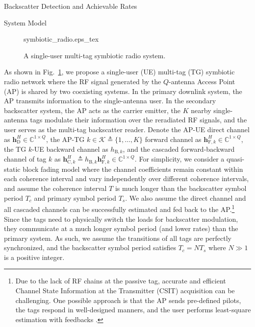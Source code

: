\documentclass[journal]{IEEEtran}
\begin{document}
	\begin{section}{Backscatter Detection and Achievable Rates}
		\begin{subsection}{System Model}
			\begin{figure}[!t]
				\centering
				\def\svgwidth{0.9\columnwidth}
				{symbiotic_radio.eps_tex}
				\caption{A single-user multi-tag symbiotic radio system.}
				\label{fi:symbiotic_radio}
			\end{figure}
			As shown in Fig.~\ref{fi:symbiotic_radio}, we propose a single-user (UE) multi-tag (TG) symbiotic radio network where the RF signal generated by the $Q$-antenna Access Point (AP) is shared by two coexisting systems. In the primary downlink system, the AP transmits information to the single-antenna user. In the secondary backscatter system, the AP acts as the carrier emitter, the $K$ nearby single-antenna tags modulate their information over the reradiated RF signals, and the user serves as the multi-tag backscatter reader. Denote the AP-UE direct channel as $\boldsymbol{h}_{\mathrm{D}}^H \in \mathbb{C}^{1 \times Q}$, the AP-TG $k \in \mathcal{K} \triangleq \{1,\ldots,K\}$ forward channel as $\boldsymbol{h}_{\mathrm{F},k}^H \in \mathbb{C}^{1 \times Q}$, the TG $k$-UE backward channel as $h_{\mathrm{B},k}$, and the cascaded forward-backward channel of tag $k$ as $\boldsymbol{h}_{\mathrm{C},k}^H \triangleq h_{\mathrm{B},k} \boldsymbol{h}_{\mathrm{F},k}^H \in \mathbb{C}^{1 \times Q}$. For simplicity, we consider a quasi-static block fading model where the channel coefficients remain constant within each coherence interval and vary independently over different coherence intervals, and assume the coherence interval $T$ is much longer than the backscatter symbol period $T_c$ and primary symbol period $T_s$. We also assume the direct channel and all cascaded channels can be successfully estimated and fed back to the AP.\footnote{Due to the lack of RF chains at the passive tag, accurate and efficient Channel State Information at the Transmitter (CSIT) acquisition can be challenging. One possible approach is that the AP sends pre-defined pilots, the tags respond in well-designed manners, and the user performs least-square estimation with feedbacks \cite{Bharadia2015,Yang2015b,Guo2019g}.} Since the tags need to physically switch the loads for backscatter modulation, they communicate at a much longer symbol period (and lower rates) than the primary system. As such, we assume the transitions of all tags are perfectly synchronized, and the backscatter symbol period satisfies $T_c = N T_s$ where $N \gg 1$ is a positive integer.


\end{subsection}
\end{section}
\end{document}

